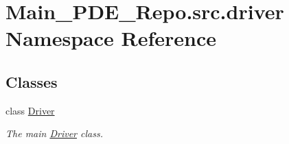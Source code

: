 \hypertarget{namespaceMain__PDE__Repo_1_1src_1_1driver}{}\section{Main\+\_\+\+P\+D\+E\+\_\+\+Repo.\+src.\+driver Namespace Reference}
\label{namespaceMain__PDE__Repo_1_1src_1_1driver}
\subsection*{Classes}
\begin{DoxyCompactItemize}
\item 
class \hyperlink{classMain__PDE__Repo_1_1src_1_1driver_1_1Driver}{Driver}
\begin{DoxyCompactList}\small\item\em The main \hyperlink{classMain__PDE__Repo_1_1src_1_1driver_1_1Driver}{Driver} class. \end{DoxyCompactList}\end{DoxyCompactItemize}
